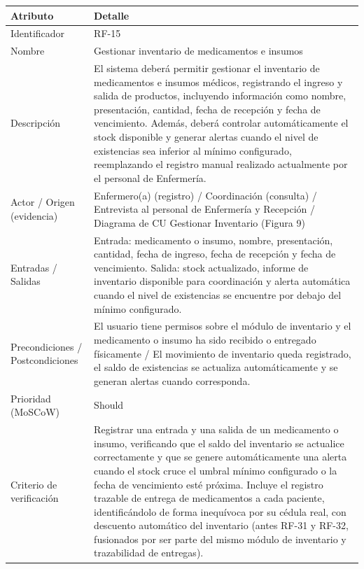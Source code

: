 \documentclass[11pt,a4paper]{article}
\begin{document}
	\begin{longtable}{p{} p{}}
		
		\toprule
		\textbf{Atributo} & \textbf{Detalle} \\
		\midrule
		\endhead
		
		Identificador &
		RF-15 \\
		
		Nombre &
		Gestionar inventario de medicamentos e insumos \\
		
		Descripción &
		El sistema deberá permitir gestionar el inventario de medicamentos e insumos médicos, registrando el ingreso y salida de productos, incluyendo información como nombre, presentación, cantidad, fecha de recepción y fecha de vencimiento. Además, deberá controlar automáticamente el stock disponible y generar alertas cuando el nivel de existencias sea inferior al mínimo configurado, reemplazando el registro manual realizado actualmente por el personal de Enfermería. \\
		
		Actor / Origen (evidencia) &
		Enfermero(a) (registro) / Coordinación (consulta) / Entrevista al personal de Enfermería y Recepción / Diagrama de CU Gestionar Inventario (Figura 9) \\
		
		Entradas / Salidas &
		Entrada: medicamento o insumo, nombre, presentación, cantidad, fecha de ingreso, fecha de recepción y fecha de vencimiento. Salida: stock actualizado, informe de inventario disponible para coordinación y alerta automática cuando el nivel de existencias se encuentre por debajo del mínimo configurado. \\
		
		Precondiciones / Postcondiciones &
		El usuario tiene permisos sobre el módulo de inventario y el medicamento o insumo ha sido recibido o entregado físicamente / El movimiento de inventario queda registrado, el saldo de existencias se actualiza automáticamente y se generan alertas cuando corresponda. \\
		
		Prioridad (MoSCoW) &
		Should \\
		
		Criterio de verificación &
		Registrar una entrada y una salida de un medicamento o insumo, verificando que el saldo del inventario se actualice correctamente y que se genere automáticamente una alerta cuando el stock cruce el umbral mínimo configurado o la fecha de vencimiento esté próxima. Incluye el registro trazable de entrega de medicamentos a cada paciente, identificándolo de forma inequívoca por su cédula real, con descuento automático del inventario (antes RF-31 y RF-32, fusionados por ser parte del mismo módulo de inventario y trazabilidad de entregas). \\
		
		\bottomrule
	\end{longtable}
	
\end{document}
